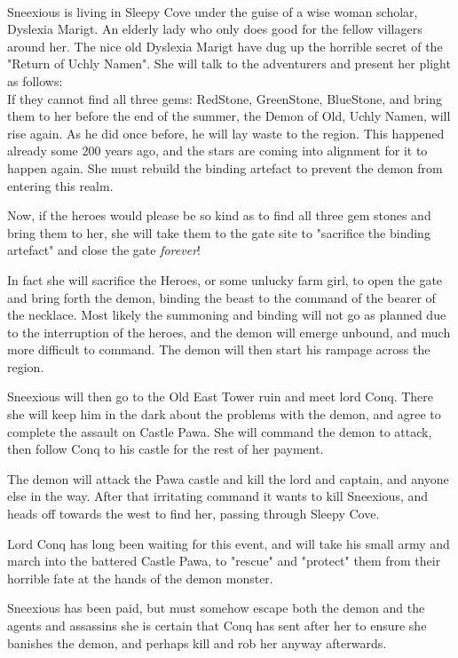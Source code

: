 \documentclass[11pt, twoside, titlepage, a4paper]{report}
\begin{document}
\

Sneexious is living in Sleepy Cove under the guise of a wise woman scholar, Dyslexia Marigt. An elderly lady who only does good for the fellow villagers around her. The nice old Dyslexia Marigt have dug up the horrible secret of the "Return of Uchly Namen". She will talk to the adventurers and present her plight as follows: \\
If they cannot find all three gems: RedStone, GreenStone, BlueStone, and bring them to her before the end of the summer, the Demon of Old, Uchly Namen, will rise again. As he did once before, he will lay waste to the region. This happened already some 200 years ago, and the stars are coming into alignment for it to happen again. She must rebuild the binding artefact to prevent the demon from entering this realm.

Now, if the heroes would please be so kind as to find all three gem stones and bring them to her, she will take them to the gate site to "sacrifice the binding artefact" and close the gate \emph{forever}!

In fact she will sacrifice the Heroes, or some unlucky farm girl, to open the gate and bring forth the demon, binding the beast to the command of the bearer of the necklace.
Most likely the summoning and binding will not go as planned due to the interruption of the heroes, and the demon will emerge unbound, and much more difficult to command. The demon will then start his rampage across the region.

Sneexious will then go to the Old East Tower ruin and meet lord Conq. There she will keep him in the dark about the problems with the demon, and agree to complete the assault on Castle Pawa. She will command the demon to attack, then follow Conq to his castle for the rest of her payment.

The demon will attack the Pawa castle and kill the lord and captain, and anyone else in the way. After that irritating command it wants to kill Sneexious, and heads off towards the west to find her, passing through Sleepy Cove.

Lord Conq has long been waiting for this event, and will take his small army and march into the battered Castle Pawa, to "rescue" and "protect" them from their horrible fate at the hands of the demon monster.

Sneexious has been paid, but must somehow escape both the demon and the agents and assassins she is certain that Conq has sent after her to ensure she banishes the demon, and perhaps kill and rob her anyway afterwards.
\end{document}
